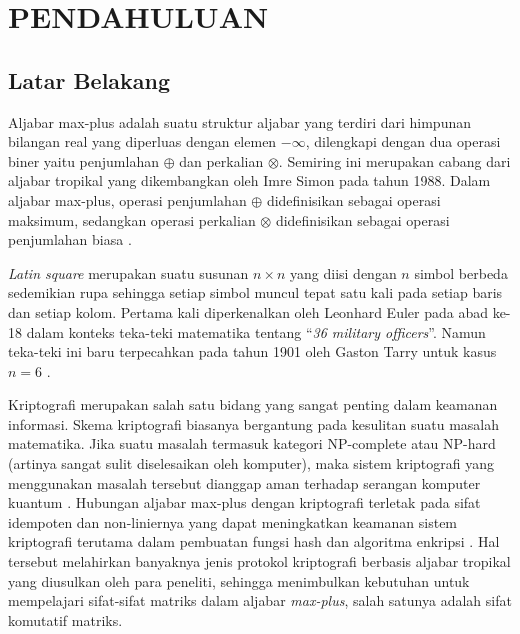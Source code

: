 \chapter{PENDAHULUAN}

\section{Latar Belakang}
Aljabar max-plus adalah suatu struktur aljabar yang terdiri dari himpunan bilangan real yang diperluas dengan elemen $-\infty$, dilengkapi dengan dua operasi biner yaitu penjumlahan $\oplus$ dan perkalian $\otimes$.
Semiring ini merupakan cabang dari aljabar tropikal yang dikembangkan oleh Imre Simon pada tahun 1988.
Dalam aljabar max-plus, operasi penjumlahan $\oplus$ didefinisikan sebagai operasi maksimum, sedangkan operasi perkalian $\otimes$ didefinisikan sebagai operasi penjumlahan biasa \parencite{subiono2015minmaxplus}.

\textit{Latin square} merupakan suatu susunan $n\times n$ yang diisi dengan $n$ simbol berbeda sedemikian rupa sehingga setiap simbol muncul tepat satu kali pada setiap baris dan setiap kolom.
Pertama kali diperkenalkan oleh Leonhard Euler pada abad ke-18 dalam konteks teka-teki matematika tentang ``\textit{36 military officers}''.
Namun teka-teki ini baru terpecahkan pada tahun 1901 oleh Gaston Tarry untuk kasus $n=6$ \parencite{george2017introductioncombinatorics}.

Kriptografi merupakan salah satu bidang yang sangat penting dalam keamanan informasi.
Skema kriptografi biasanya bergantung pada kesulitan suatu masalah matematika. Jika suatu masalah termasuk kategori NP-complete atau NP-hard (artinya sangat sulit diselesaikan oleh komputer), maka sistem kriptografi yang menggunakan masalah tersebut dianggap aman terhadap serangan komputer kuantum
\parencite{huang2024newsemiring}.
Hubungan aljabar max-plus dengan kriptografi terletak pada sifat idempoten dan non-liniernya yang dapat meningkatkan keamanan sistem kriptografi
terutama dalam pembuatan fungsi hash dan algoritma enkripsi \parencite{durcheva2025cryptographyidempotent}. Hal tersebut melahirkan banyaknya jenis protokol kriptografi berbasis aljabar tropikal yang diusulkan oleh para peneliti, sehingga menimbulkan kebutuhan untuk mempelajari sifat-sifat matriks dalam aljabar \textit{max-plus}, salah satunya adalah sifat komutatif matriks.

